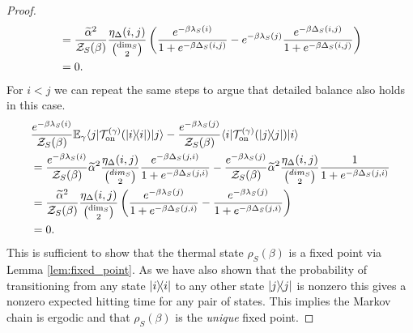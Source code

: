\begin{proof}
\begin{align}
    &= \frac{\widetilde{\alpha}^2}{\mathcal{Z}_S(\beta)} \frac{\eta_\Delta(i,j)}{\binom{\dim_S}{2}} \left(\frac{e^{-\beta \lambda_S(i)}}{1 + e^{-\beta \Delta_S(i,j)}} - e^{-\beta \lambda_S(j)} \frac{e^{-\beta \Delta_S(i,j)}}{1 + e^{-\beta \Delta_S(i,j)} } \right) \\
    &= 0.
\end{align}
For $i < j$ we can repeat the same steps to argue that detailed balance also holds in this case.
\begin{align}
    &\frac{e^{-\beta \lambda_S(i)}}{\mathcal{Z}_S(\beta)} \mathbb{E}_\gamma \langle j| \mathcal{T}_{\rm on}^{(\gamma)}(| i\rangle\! \langle i|) |j\rangle - \frac{e^{-\beta \lambda_S(j)}}{\mathcal{Z}_S(\beta)} \langle i| \mathcal{T}_{\rm on}^{(\gamma)}(| j\rangle\! \langle j|) |i\rangle \nonumber \\
    &= \frac{e^{-\beta \lambda_S(i)}}{\mathcal{Z}_S(\beta)} \widetilde{\alpha}^2 \frac{\eta_\Delta(i,j)}{\binom{dim_S}{2}} \frac{e^{-\beta \Delta_S(j, i)}}{1 + e^{-\beta \Delta_S(j, i)}} - \frac{e^{-\beta \lambda_S(j)}}{\mathcal{Z}_S(\beta)} \widetilde{\alpha}^2 \frac{\eta_\Delta(i,j)}{\binom{dim_S}{2}} \frac{1}{1 + e^{-\beta \Delta_S(j, i)}} \\
    &= \frac{\widetilde{\alpha}^2}{\mathcal{Z}_S(\beta)} \frac{\eta_\Delta(i,j)}{\binom{\dim_S}{2}} \left(\frac{e^{-\beta \lambda_S(j)}}{1 + e^{-\beta \Delta_S(j, i)}} - \frac{e^{-\beta \lambda_S(j)}}{1 + e^{-\beta \Delta_S(j, i)} } \right) \\
    &= 0.
\end{align}
This is sufficient to show that the thermal state $\rho_S(\beta)$ is a fixed point via Lemma \ref{lem:fixed_point}. As we have also shown that the probability of transitioning from any state $| i\rangle\! \langle i|$ to any other state $| j\rangle\! \langle j|$ is nonzero this gives a nonzero expected hitting time for any pair of states. This implies the Markov chain is ergodic and that $\rho_S(\beta)$ is the \emph{unique} fixed point.


\end{proof}
